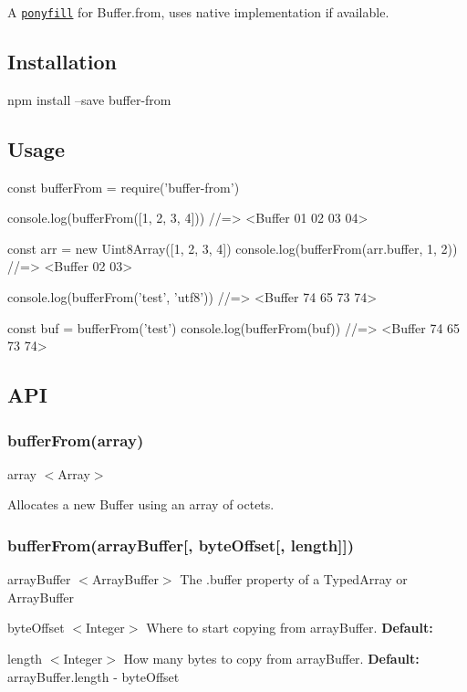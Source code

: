 A \href{https://ponyfill.com}{\tt ponyfill} for {\ttfamily Buffer.\+from}, uses native implementation if available.

\subsection*{Installation}


\begin{DoxyCode}
npm install --save buffer-from
\end{DoxyCode}


\subsection*{Usage}


\begin{DoxyCode}
const bufferFrom = require('buffer-from')

console.log(bufferFrom([1, 2, 3, 4]))
//=> <Buffer 01 02 03 04>

const arr = new Uint8Array([1, 2, 3, 4])
console.log(bufferFrom(arr.buffer, 1, 2))
//=> <Buffer 02 03>

console.log(bufferFrom('test', 'utf8'))
//=> <Buffer 74 65 73 74>

const buf = bufferFrom('test')
console.log(bufferFrom(buf))
//=> <Buffer 74 65 73 74>
\end{DoxyCode}


\subsection*{A\+PI}

\subsubsection*{buffer\+From(array)}


\begin{DoxyItemize}
\item {\ttfamily array} $<$Array$>$
\end{DoxyItemize}

Allocates a new {\ttfamily Buffer} using an {\ttfamily array} of octets.

\subsubsection*{buffer\+From(array\+Buffer\mbox{[}, byte\+Offset\mbox{[}, length\mbox{]}\mbox{]})}


\begin{DoxyItemize}
\item {\ttfamily array\+Buffer} $<$Array\+Buffer$>$ The {\ttfamily .buffer} property of a Typed\+Array or Array\+Buffer
\item {\ttfamily byte\+Offset} $<$Integer$>$ Where to start copying from {\ttfamily array\+Buffer}. {\bfseries Default\+:} {}
\item {\ttfamily length} $<$Integer$>$ How many bytes to copy from {\ttfamily array\+Buffer}. {\bfseries Default\+:} {\ttfamily array\+Buffer.\+length -\/ byte\+Offset}
\end{DoxyItemize}

